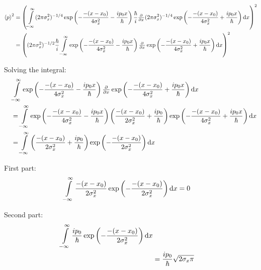 \documentclass[a4paper,german,12pt,smallheadings]{scrartcl}
\begin{document}
\begin{enumerate}[a)]
    \begin{align*}
      \braket{p}^2 &= \del{
                        \int\limits_{-\infty}^\infty 
                        (2\pi\sigma_x^2)^{-1/4} \exp\del{-\frac{-(x-x_0)}{4\sigma_x^2} - \frac{ip_0x}{\hbar}}
                        \frac{\hbar}{i} \pd{}{x}
                        (2\pi\sigma_x^2)^{-1/4} \exp\del{-\frac{-(x-x_0)}{4\sigma_x^2} + \frac{ip_0x}{\hbar}}
                        \dif x
                       }^2 \\
                    &= \del{
                       (2\pi\sigma_x^2)^{-1/2} \frac{\hbar}{i}
                        \int\limits_{-\infty}^\infty
                        \exp\del{-\frac{-(x-x_0)}{4\sigma_x^2} - \frac{ip_0x}{\hbar}}
                        \pd{}{x}
                        \exp\del{-\frac{-(x-x_0)}{4\sigma_x^2} + \frac{ip_0x}{\hbar}}
                        \dif x
                       }^2
    \end{align*}

    Solving the integral:
    \begin{align*}
      \quad&\int\limits_{-\infty}^\infty
      \exp\del{-\frac{-(x-x_0)}{4\sigma_x^2} - \frac{ip_0x}{\hbar}}
      \pd{}{x}
      \exp\del{-\frac{-(x-x_0)}{4\sigma_x^2} + \frac{ip_0x}{\hbar}}
      \dif x \\
      &=
      \int\limits_{-\infty}^\infty
      \exp\del{-\frac{-(x-x_0)}{4\sigma_x^2} - \frac{ip_0x}{\hbar}}
      \del{\frac{-(x-x_0)}{2\sigma_x^2} + \frac{ip_0}{\hbar}}
      \exp\del{-\frac{-(x-x_0)}{4\sigma_x^2} + \frac{ip_0x}{\hbar}}
      \dif x \\
      &=
      \int\limits_{-\infty}^\infty
      \del{\frac{-(x-x_0)}{2\sigma_x^2} + \frac{ip_0}{\hbar}}
      \exp\del{-\frac{-(x-x_0)}{2\sigma_x^2}}
      \dif x \\
    \end{align*}

    First part:
    \begin{align*}
      \int\limits_{-\infty}^\infty
      \frac{-(x-x_0)}{2\sigma_x^2}
      \exp\del{-\frac{-(x-x_0)}{2\sigma_x^2}}
      \dif x
      &= 0
    \end{align*}

    Second part:
    \begin{align*}
      \int\limits_{-\infty}^\infty
      \frac{ip_0}{\hbar}
      \exp\del{-\frac{-(x-x_0)}{2\sigma_x^2}}
      \dif x \\
      &= \frac{ip_0}{\hbar} \sqrt{2\sigma_x \pi}
    \end{align*}


\end{enumerate}
\end{document}
